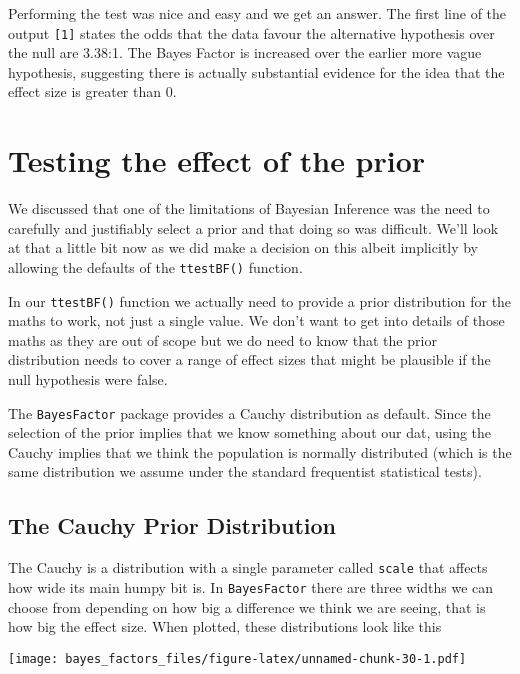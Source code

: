\documentclass[
]{book}
\begin{document}
Performing the test was nice and easy and we get an answer. The first line of the output \texttt{{[}1{]}} states the odds that the data favour the alternative hypothesis over the null are 3.38:1. The Bayes Factor is increased over the earlier more vague hypothesis, suggesting there is actually substantial evidence for the idea that the effect size is greater than 0.

\hypertarget{testing-the-effect-of-the-prior}{%
\section{Testing the effect of the prior}\label{testing-the-effect-of-the-prior}}

We discussed that one of the limitations of Bayesian Inference was the need to carefully and justifiably select a prior and that doing so was difficult. We'll look at that a little bit now as we did make a decision on this albeit implicitly by allowing the defaults of the \texttt{ttestBF()} function.

In our \texttt{ttestBF()} function we actually need to provide a prior distribution for the maths to work, not just a single value. We don't want to get into details of those maths as they are out of scope but we do need to know that the prior distribution needs to cover a range of effect sizes that might be plausible if the null hypothesis were false.

The \texttt{BayesFactor} package provides a Cauchy distribution as default. Since the selection of the prior implies that we know something about our dat, using the Cauchy implies that we think the population is normally distributed (which is the same distribution we assume under the standard frequentist statistical tests).

\hypertarget{the-cauchy-prior-distribution}{%
\subsection{The Cauchy Prior Distribution}\label{the-cauchy-prior-distribution}}

The Cauchy is a distribution with a single parameter called \texttt{scale} that affects how wide its main humpy bit is. In \texttt{BayesFactor} there are three widths we can choose from depending on how big a difference we think we are seeing, that is how big the effect size. When plotted, these distributions look like this

\texttt{[image: bayes\_factors\_files/figure-latex/unnamed-chunk-30-1.pdf]}
\end{document}
